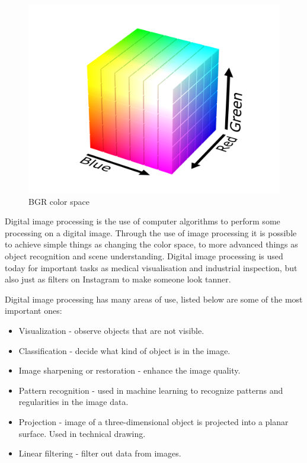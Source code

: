 \begin{figure}[h]
    \centering
    \includegraphics[width=.9\linewidth]{images/introduction/RGB_color_solid_cube}
    \caption{BGR color space}
    \label{fig:bgr_color_space}
\end{figure}

Digital image processing is the use of computer algorithms to perform some processing on a digital image. Through the use of image processing it is possible to achieve simple things as changing the color space, to more advanced things as object recognition and scene understanding. Digital image processing is used today for important tasks as medical visualisation and industrial inspection, but also just as filters on Instagram to make someone look tanner. 

Digital image processing has many areas of use, listed below are some of the most important ones:
\begin{itemize}
\item Visualization - observe objects that are not visible.
\item Classification - decide what kind of object is in the image.
\item Image sharpening or restoration - enhance the image quality.
\item Pattern recognition - used in machine learning to recognize patterns and regularities in the image data.
\item Projection - image of a three-dimensional object is projected into a planar surface. Used in technical drawing.
\item Linear filtering - filter out data from images.
\end{itemize}
 

